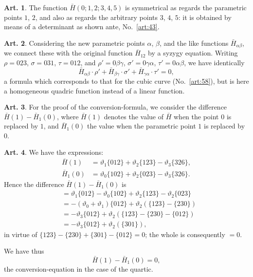 \documentclass[12pt,a4paper]{article}
\theoremstyle{definition}
\newtheorem{art}{Art.}[section]
\begin{document}
\begin{art}\label{art:75}
The function $\bar{H}(0; 1, 2; 3, 4, 5)$ is symmetrical as regards the parametric points $1$, $2$, and also as regards the arbitrary points $3$, $4$, $5$: it is obtained by means of a determinant as shown ante, No.~\ref{art:43}.
\end{art}

\newpage
\begin{art}\label{art:76}
Considering the new parametric points $\alpha$, $\beta$, and the like functions $\bar{H}_{\alpha\beta}$, we connect these with the original function $\bar{H}_{12}$ by a syzygy equation. Writing $\rho = 023$, $\sigma = 031$, $\tau = 012$, and $\rho' = 0\beta\gamma$, $\sigma' = 0\gamma\alpha$, $\tau' = 0\alpha\beta$, we have identically
\[
\bar{H}_{\alpha\beta} \cdot \rho' + \bar{H}_{\beta\gamma} \cdot \sigma' + \bar{H}_{\gamma\alpha} \cdot \tau' = 0,
\]
a formula which corresponds to that for the cubic curve (No.~\ref{art:58}), but is here a homogeneous quadric function instead of a linear function.
\end{art}

\begin{art}\label{art:77}
For the proof of the conversion-formula, we consider the difference $\bar{H}(1) - \bar{H}_1(0)$, where $\bar{H}(1)$ denotes the value of $\bar{H}$ when the point $0$ is replaced by $1$, and $\bar{H}_1(0)$ the value when the parametric point $1$ is replaced by $0$.
\end{art}

\newpage
\begin{art}\label{art:78}
We have the expressions:
\begin{align*}
\bar{H}(1) &= \vartheta_1\{012\} + \vartheta_2\{123\} - \vartheta_3\{326\},\\
\bar{H}_1(0) &= \vartheta_0\{102\} + \vartheta_2\{023\} - \vartheta_3\{326\}.
\end{align*}
Hence the difference $\bar{H}(1) - \bar{H}_1(0)$ is
\begin{align*}
&= \vartheta_1\{012\} - \vartheta_0\{102\} + \vartheta_2\{123\} - \vartheta_2\{023\}\\
&= -(\vartheta_0 + \vartheta_1)\{012\} + \vartheta_2(\{123\} - \{230\})\\
&= -\vartheta_3\{012\} + \vartheta_2(\{123\} - \{230\} - \{012\})\\
&= -\vartheta_3\{012\} + \vartheta_2(\{301\}),
\end{align*}
in virtue of $\{123\} - \{230\} + \{301\} - \{012\} = 0$; the whole is consequently $= 0$.

We have thus
\[
\bar{H}(1) - \bar{H}_1(0) = 0,
\]
the conversion-equation in the case of the quartic.
\end{art}
\end{document}
